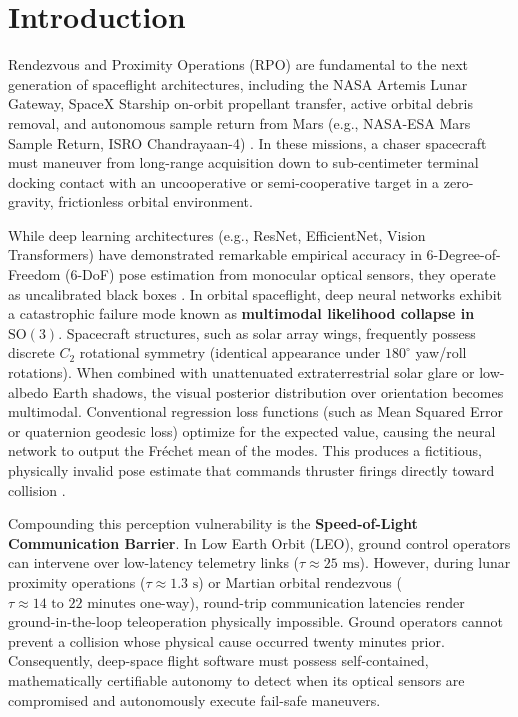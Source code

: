\documentclass[conference]{IEEEtran}
\begin{document}
\section{Introduction}
 Rendezvous and Proximity Operations (RPO) are fundamental to the next generation of spaceflight architectures, including the NASA Artemis Lunar Gateway, SpaceX Starship on-orbit propellant transfer, active orbital debris removal, and autonomous sample return from Mars (e.g., NASA-ESA Mars Sample Return, ISRO Chandrayaan-4) \cite{isro_spadex, esa_speed}. In these missions, a chaser spacecraft must maneuver from long-range acquisition down to sub-centimeter terminal docking contact with an uncooperative or semi-cooperative target in a zero-gravity, frictionless orbital environment.

While deep learning architectures (e.g., ResNet, EfficientNet, Vision Transformers) have demonstrated remarkable empirical accuracy in 6-Degree-of-Freedom (6-DoF) pose estimation from monocular optical sensors, they operate as uncalibrated black boxes \cite{kisantal2020speed}. In orbital spaceflight, deep neural networks exhibit a catastrophic failure mode known as \textbf{multimodal likelihood collapse in $\mathrm{SO}(3)$}. Spacecraft structures, such as solar array wings, frequently possess discrete $C_2$ rotational symmetry (identical appearance under $180^\circ$ yaw/roll rotations). When combined with unattenuated extraterrestrial solar glare or low-albedo Earth shadows, the visual posterior distribution over orientation becomes multimodal. Conventional regression loss functions (such as Mean Squared Error or quaternion geodesic loss) optimize for the expected value, causing the neural network to output the Fréchet mean of the modes. This produces a fictitious, physically invalid pose estimate that commands thruster firings directly toward collision \cite{park2021speedplus}.

Compounding this perception vulnerability is the \textbf{Speed-of-Light Communication Barrier}. In Low Earth Orbit (LEO), ground control operators can intervene over low-latency telemetry links ($\tau \approx 25\text{ ms}$). However, during lunar proximity operations ($\tau \approx 1.3\text{ s}$) or Martian orbital rendezvous ($\tau \approx 14\text{ to } 22\text{ minutes}$ one-way), round-trip communication latencies render ground-in-the-loop teleoperation physically impossible. Ground operators cannot prevent a collision whose physical cause occurred twenty minutes prior. Consequently, deep-space flight software must possess self-contained, mathematically certifiable autonomy to detect when its optical sensors are compromised and autonomously execute fail-safe maneuvers.
\end{document}

